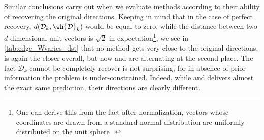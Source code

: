 Similar conclusions carry out when we evaluate methods according to their ability of recovering the
original directions. Keeping in mind that in the case of perfect recovery, $d(\mathcal{D}_k,
\mathcal{\wh{D}}_k)$ would be equal to zero, while the distance between two $d$-dimensional unit
vectors is $\sqrt{2}$ in expectation\footnote{One can derive this from the fact after normalization,
vectors whose coordinates are drawn from a standard normal distribution are uniformly distributed on
the unit sphere~\autocite{gaussianSphere59}.}, we see in \autoref{tab:edge_Wvaries_dst} that no
method gets very close to the original directions. \combined{} is again the closer overall, but now
\kmeans{} and \lloyd{} are alternating at the second place. The fact $\mathcal{D}_k$ cannot be
completely recover is not surprising, for in absence of prior information the problem is
under-constrained. Indeed, while \combined{} and \pqt{} delivers almost the exact same prediction,
their directions are clearly different.

